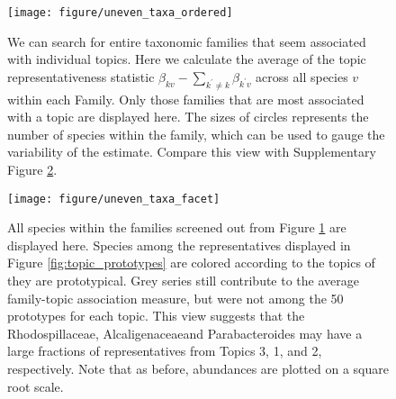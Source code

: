 \documentclass[oupdraft]{bio}
\begin{document}
\begin{figure}[!p]
  \centering
  \texttt{[image: figure/uneven\_taxa\_ordered]}
  \caption{We can search for entire taxonomic families that seem associated with
    individual topics. Here we calculate the average of the topic
    representativeness statistic $\beta_{kv} - \sum_{k^{\prime} \neq k}
    \beta_{k^{\prime} v}$ across all species $v$ within each
    Family. Only those families that are most associated with a topic are
    displayed here. The sizes of circles represents the number of species within
    the family, which can be used to gauge the variability of the
    estimate. Compare this view with Supplementary Figure
    \ref{fig:uneven_taxa_facet}. \label{fig:uneven_taxa_ordered} }
\end{figure}

\begin{figure}[!p]
  \centering
  \texttt{[image: figure/uneven\_taxa\_facet]}
  \caption{All species within the families screened out from Figure
    \ref{fig:uneven_taxa_ordered} are displayed here. Species among the
    representatives displayed in Figure \ref{fig:topic_prototypes} are colored
    according to the topics of they are prototypical. Grey series still
    contribute to the average family-topic association measure, but were not
    among the 50 prototypes for each topic. This view suggests that the
    Rhodospillaceae, Alcaligenaceaeand Parabacteroides may have a large
    fractions of representatives from Topics 3, 1, and 2, respectively. Note
    that as before, abundances are plotted on a square root
    scale. \label{fig:uneven_taxa_facet} }
\end{figure}
\end{document}

